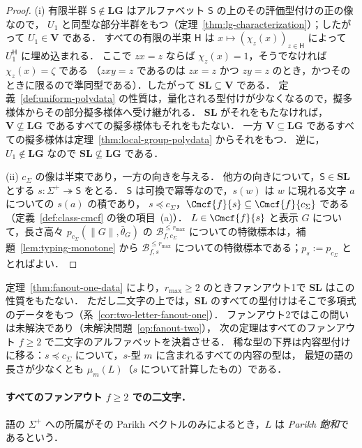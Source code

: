 \begin{proof}
(i) 有限半群 $\mathsf S\notin\mathbf{LG}$ はアルファベット $\mathsf S$ の上のその評価型付けの正の像なので，
$U_1$ と同型な部分半群をもつ（定理~\ref{thm:lg-characterization}）；したがって $U_1\in\mathbf V$ である．
すべての有限の半束 $\mathsf H$ は $x\mapsto(\chi_z(x))_{z\in\mathsf H}$ によって $U_1^{\mathsf H}$ に埋め込まれる．
ここで $zx=z$ ならば $\chi_z(x)=1$，そうでなければ $\chi_z(x)=\zeta$ である
（$zxy=z$ であるのは $zx=z$ かつ $zy=z$ のとき，かつそのときに限るので準同型である）．したがって $\mathbf{SL}\subseteq\mathbf V$ である．
定義~\ref{def:uniform-polydata} の性質は，量化される型付けが少なくなるので，擬多様体からその部分擬多様体へ受け継がれる．
$\mathbf{SL}$ がそれをもたなければ，$\mathbf V\not\subseteq\mathbf{LG}$ であるすべての擬多様体もそれをもたない．
一方 $\mathbf V\subseteq\mathbf{LG}$ であるすべての擬多様体は定理~\ref{thm:local-group-polydata} からそれをもつ．
逆に，$U_1\notin\mathbf{LG}$ なので $\mathbf{SL}\not\subseteq\mathbf{LG}$ である．

(ii) $c_\Sigma$ の像は半束であり，一方の向きを与える．
他方の向きについて，$\mathsf S\in\mathbf{SL}$ とする $s:\Sigma^+\twoheadrightarrow\mathsf S$ をとる．
$\mathsf S$ は可換で冪等なので，$s(w)$ は $w$ に現れる文字 $a$ についての $s(a)$ の積であり，
$s\preceq c_\Sigma$，$\Cmcf{f}{s}\subseteq\Cmcf{f}{c_\Sigma}$ である（定義~\ref{def:class-cmcf} の後の項目~(a)）．
$L\in\Cmcf{f}{s}$ と表示 $G$ について，長さ高々 $p_{c_\Sigma}(\|G\|,\bar\theta_G)$ の
$\mathcal B^{\le r_{\max}}_{f,c_\Sigma}$ についての特徴標本は，補題~\ref{lem:typing-monotone} から
$\mathcal B^{\le r_{\max}}_{f,s}$ についての特徴標本である；$p_{s}:=p_{c_\Sigma}$ ととればよい．
\end{proof}

定理~\ref{thm:fanout-one-data} により，$r_{\max}\ge2$ のときファンアウト1で $\mathbf{SL}$ はこの性質をもたない．
ただし二文字の上では，$\mathbf{SL}$ のすべての型付けはそこで多項式のデータをもつ（系~\ref{cor:two-letter-fanout-one}）．
ファンアウト2ではこの問いは未解決であり（未解決問題~\ref{op:fanout-two}），
次の定理はすべてのファンアウト $f\ge2$ で二文字のアルファベットを決着させる．
稀な型の下界は内容型付けに移る：$s\preceq c_\Sigma$ について，$s$-型 $m$ に含まれるすべての内容の型は，
最短の語の長さが少なくとも $\mu_m(L)$（$s$ について計算したもの）である．

\paragraph{すべてのファンアウト $f\ge2$ での二文字．}
語の $\Sigma^+$ への所属がその Parikh ベクトルのみによるとき，$L$ は \emph{Parikh 飽和}であるという．

